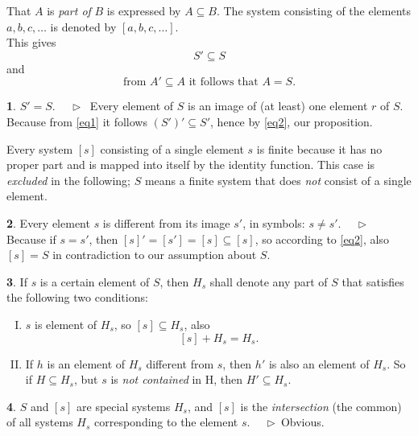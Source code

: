 \documentclass[leqno,hidelinks]{article}
\theoremstyle{definition}
\newtheorem{satz}{\protect\satzname}
\newtheorem{deff}[satz]{\protect\deffname}
\newcommand{\satzname}{}
\newcommand{\deffname}{}
\renewcommand{\satzname}{\hspace{-4pt}.\ Satz}%
\renewcommand{\deffname}{\hspace{-4pt}.\ Definition}%
\renewcommand{\satzname}{\hspace{-4pt}.\ Theorem}%
\renewcommand{\deffname}{\hspace{-4pt}.\ Definition}%
\newcommand\Beweis{\medskip \newline $ \phantom{'.'} \rhd \ $}%
\newcommand{\partof}{\subseteq}
\begin{document}
\begin{paracol}{2}
That $A$ is \emph{part of} $B$ is expressed by $A \partof B$. The system consisting
of the elements $a, b, c, \ldots$ is denoted by $[a, b, c, \ldots]$.
\ \\

This gives
\begin{equation}\label{eq1}
				S' \partof S
\end{equation}
and %
\begin{equation}\label{eq2}
		\text{from } A' \partof A \text{ it follows that } A = S.
\end{equation}

\begin{satz}\label{thm1}$S' = S$.
\Beweis
Every element of $S$ is an image of (at least) one element $r$ of $S$. Because
from \eqref{eq1} it follows $(S')' \partof S'$, hence by \eqref{eq2}, our proposition.
\end{satz}
Every system $[s]$ consisting of a single element $s$ is finite because it has
no proper part and is mapped into itself by the identity function. This case is
\emph{excluded} in the following; $S$ means a finite system that does \emph{not}
consist of a single element.

\begin{satz}\label{thm2}
Every element $s$ is different from its image $s'$, in symbols: $s \neq s'$.
\Beweis
Because if $s = s'$, then $[s]' = [s'] = [s] \partof [s]$, so according to
\eqref{eq2}, also $[s] = S$ in contradiction to our assumption about $S$.
\end{satz}

\newpage

\begin{deff}\label{def3}
If $s$ is a certain element of $S$, then $H_s$ shall denote any part of $S$ that
satisfies the following two conditions:
\vspace{8pt} %

\begin{enumerate}[I.]
\item $s$ is element of $H_s$, so $[s] \partof H_s$, also
\[
	[s] + H_s = H_s.
\]
\item If $h$ is an element of $H_s$ different from $s$, then $h'$ is also an
element of $H_s$. So if $H \partof H_s$, but $s$ is \emph{not contained} in H,
then $H' \partof H_s$.
\end{enumerate}
\end{deff}

\begin{satz}\label{thm4}
$S$ and $[s]$ are special systems $H_s$, and $[s]$ is the \emph{intersection}
(the common) of all systems $H_s$ corresponding to the element $s$.
\Beweis Obvious. \end{satz}


\end{paracol}
\end{document}
